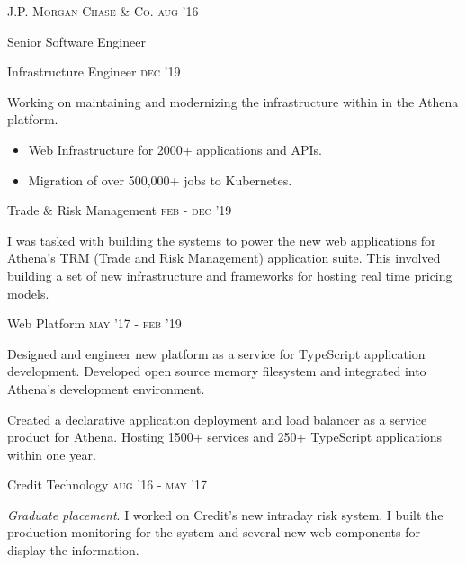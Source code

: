 
\textsc{\small{J.P. Morgan Chase \& Co. }}
\hfill
\textsc{\small{\raggedleft aug '16 -}}

{\Large Senior Software Engineer}

\vspace{5pt}

{\large Infrastructure Engineer}
\hfill
\textsc{\small{\raggedleft dec '19 }}

Working on maintaining and modernizing the infrastructure within in the Athena platform.

\begin{itemize}
	\item Web Infrastructure for 2000+ applications and APIs.
	\item Migration of over 500,000+ jobs to Kubernetes.
\end{itemize}

\vspace{8pt}

{\large Trade \& Risk Management}
\hfill
\textsc{\small{\raggedleft feb - dec '19}}

I was tasked with building the systems to power the new web applications for Athena's TRM (Trade and Risk Management) application suite. This involved building a set of new infrastructure and frameworks for hosting real time pricing models. 

\vspace{8pt}

{\large Web Platform}
\hfill
\textsc{\small{\raggedleft may '17 - feb '19}}

Designed and engineer new platform as a service for TypeScript application development. Developed open source memory filesystem and  integrated into Athena's development environment. 

Created a declarative application deployment and load balancer as a service product for Athena. Hosting 1500+ services and 250+ TypeScript applications within one year.

\vspace{8pt}

{\large Credit Technology}
\hfill
\textsc{\small{\raggedleft aug '16 - may '17}}

\textit{Graduate placement}. I worked on Credit's new intraday risk system. I built the production monitoring for the system and several new web components for display the information. 